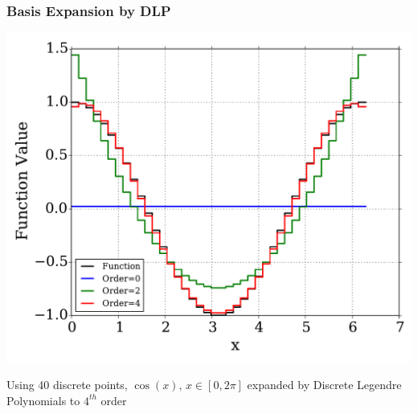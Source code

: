 \documentclass[fleqn]{beamer}
\begin{document}
  \begin{frame}
      \frametitle{Basis Expansion by DLP}
      \centering
      \includegraphics[trim=.1cm .25cm .1cm .4cm, clip=true,
    totalheight=0.65\textheight]{Figures/expansion}
    \begin{block}{}
    Using 40 discrete points, $\cos(x), \, x\in[0,2\pi]$ expanded by 
Discrete Legendre Polynomials to $4^{th}$ order
\end{block}
  \end{frame}
\end{document}

